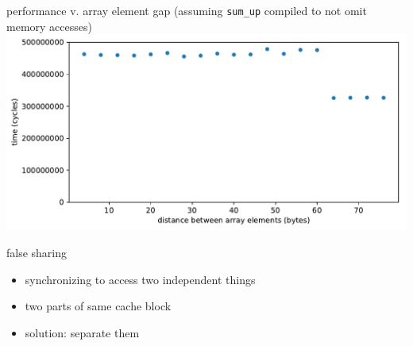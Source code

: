 \begin{frame}{performance v. array element gap}
(assuming \texttt{sum\_up} compiled to not omit memory accesses)
\includegraphics[width=\textwidth]{../sync/sum-up}
\end{frame}

\begin{frame}{false sharing}
\begin{itemize}
\item synchronizing to access two independent things
\vspace{.5cm}
\item two parts of same cache block
\item solution: separate them
\end{itemize}
\end{frame}
